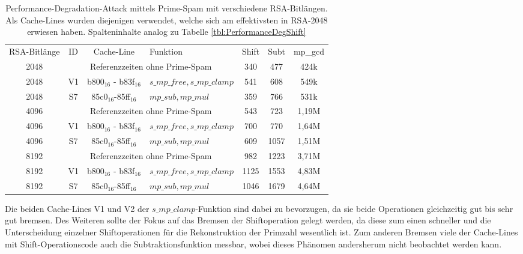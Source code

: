 \begin{table}[h]
\caption{Performance-Degradation-Attack mittels Prime-Spam mit verschiedene RSA-Bitlängen.
Als Cache-Lines wurden diejenigen verwendet, welche sich am effektivsten in RSA-2048 erwiesen haben.
Spalteninhalte analog zu Tabelle \ref{tbl:PerformanceDegShift}}
\label{tbl:PerformanceDegRSADifferentBitlength}
\begin{tabular}{ccclccc}
RSA-Bitlänge & ID & Cache-Line & Funktion & Shift & Subt & mp\_gcd \\[10pt]
2048         &\multicolumn{3}{c}{Referenzzeiten ohne Prime-Spam}                                         & 340   & 477         & 424k    \\
2048         & V1& b800$_{16}$ - b83f$_{16}$ & $s\_mp\_free, s\_mp\_clamp$                 & 541   & 608         & 549k    \\
2048         & S7& 85c0$_{16}$-85ff$_{16}$  & $mp\_sub, mp\_mul$            & 359   & 766         & 531k    \\
4096         & \multicolumn{3}{c}{Referenzzeiten ohne Prime-Spam}                                         & 543   & 723         & 1,19M    \\
4096         & V1& b800$_{16}$ - b83f$_{16}$ & $s\_mp\_free, s\_mp\_clamp$                 & 700   & 770         & 1,64M    \\
4096         & S7& 85c0$_{16}$-85ff$_{16}$  & $mp\_sub, mp\_mul$            & 609   & 1057         & 1,51M    \\
8192         & \multicolumn{3}{c}{Referenzzeiten ohne Prime-Spam}                                         & 982   & 1223         & 3,71M    \\
8192         & V1& b800$_{16}$ - b83f$_{16}$ & $s\_mp\_free, s\_mp\_clamp$                 & 1125   & 1553         & 4,83M    \\
8192         & S7& 85c0$_{16}$-85ff$_{16}$  & $mp\_sub, mp\_mul$            & 1046   & 1679         & 4,64M    \\
\end{tabular}
\end{table}

Die beiden Cache-Lines V1 und V2 der $s\_mp\_clamp$-Funktion sind dabei zu bevorzugen, da sie beide Operationen gleichzeitig gut bis sehr gut bremsen.
Des Weiteren sollte der Fokus auf das Bremsen der Shiftoperation gelegt werden, da diese zum einen schneller und die Unterscheidung einzelner Shiftoperationen für die Rekonstruktion der Primzahl wesentlich ist.
Zum anderen Bremsen viele der Cache-Lines mit Shift-Operationscode auch die Subtraktionsfunktion messbar, wobei dieses Phänomen andersherum nicht beobachtet werden kann. 

